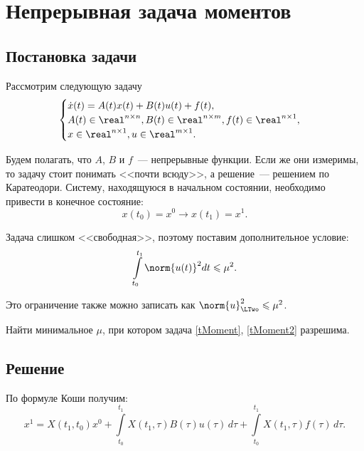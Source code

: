 \section{Непрерывная задача моментов}

\subsection{Постановка задачи}

Рассмотрим следующую задачу
\begin{gather}
\label{tMoment}
	\begin{cases}
	  \dot{x}(t) = A(t) x(t) + B(t) u(t) + f(t),\\
	  A(t) \in \real^{n \times n}, B(t) \in \real^{n \times m}, f(t) \in \real^{n \times 1},\\
	  x \in \real^{n \times 1}, u \in \real^{m \times 1}.
	\end{cases}
\end{gather}

Будем полагать, что $A$, $B$ и $f$~--- непрерывные функции.
Если же они измеримы, то задачу стоит понимать <<почти всюду>>, а решение~--- решением по Каратеодори.
Систему, находящуюся в начальном состоянии, необходимо привести в конечное состояние:
\begin{equation}
\label{tMoment2}
	x(t_0) = x^0 \longrightarrow x(t_1)= x^1.
\end{equation}

Задача слишком <<свободная>>, поэтому поставим дополнительное условие:
\begin{equation}
\label{ogr}
	\int\limits_{t_0}^{t_1} \norm{u(t)}^2 dt \leqslant \mu^2.
\end{equation}

Это ограничение также можно записать как $\norm{u}_\LTwo^2 \leqslant \mu^2$.

\begin{problem}
  Найти минимальное $\mu$, при котором задача \eqref{tMoment},
  \eqref{tMoment2} разрешима.
\end{problem}

\subsection{Решение}

По формуле Коши получим:
\begin{equation*}
	x^1 = X(t_1, t_0) x^0 + \int\limits_{t_0}^{t_1} X(t_1, \tau) B(\tau) u(\tau)\,d\tau +
	\int\limits_{t_0}^{t_1} X(t_1, \tau) f(\tau)\,d\tau.
\end{equation*}

